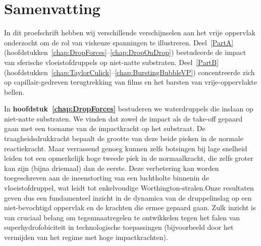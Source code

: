 \chapter[Samenvatting]{Samenvatting\raisebox{.3\baselineskip}{\normalsize\footnotemark}}


In dit proefschrift hebben wij verschillende verschijnselen aan het vrije oppervlak onderzocht om de rol van viskeuze spanningen te illustreren. Deel~\ref{PartA} (hoofdstukken~\ref{chap:DropForces}--\ref{chap:DropOnDrop}) bestudeerde de impact van sferische vloeistofdruppels op niet-natte substraten. Deel~\ref{PartB} (hoofdstukken~\ref{chap:TaylorCulick}--\ref{chap:BurstingBubbleVP}) concentreerde zich op capillair-gedreven terugtrekking van films en het barsten van vrije-oppervlakte bellen.

In \textbf{hoofdstuk~\ref{chap:DropForces}} bestuderen we waterdruppels die inslaan op niet-natte substraten. We vinden dat zowel de impact als de take-off gepaard gaan met een toename van de impactkracht op het substraat. De traagheidsdrukkracht bepaalt de grootte van deze beide pieken in de normale reactiekracht. Maar verrassend genoeg kunnen zelfs botsingen bij lage snelheid leiden tot een opmerkelijk hoge tweede piek in de normaalkracht, die zelfs groter kan zijn (bijna driemaal) dan de eerste. Deze verbetering kan worden toegeschreven aan de ineenstorting van een luchtholte binnenin de vloeistofdruppel, wat leidt tot enkelvoudige Worthington-stralen.Onze resultaten geven dus een fundamenteel inzicht in de dynamica van de druppelinslag op een niet-bevochtigd oppervlak en de krachten die ermee gepaard gaan. Zulk inzicht is van cruciaal belang om tegenmaatregelen te ontwikkelen tegen het falen van superhydrofobiciteit in technologische toepassingen (bijvoorbeeld door het vermijden van het regime met hoge impactkrachten).

